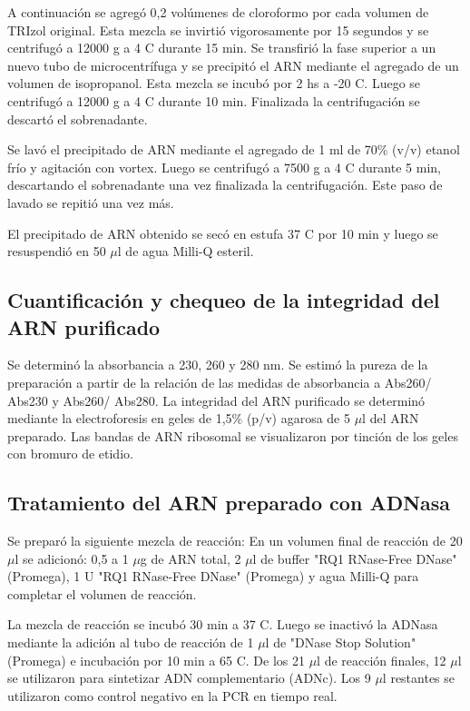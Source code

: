 A continuación se agregó 0,2 volúmenes de cloroformo por cada volumen de TRIzol original.
Esta mezcla se invirtió vigorosamente por 15 segundos y se centrifugó a 12000 g a 4 \degree C durante 15 min.
Se transfirió la fase superior a un nuevo tubo de microcentrífuga y se precipitó el ARN mediante el agregado de un volumen de isopropanol.
Esta mezcla se incubó por 2 hs a -20 \degree C. Luego se centrifugó a 12000 g a 4 \degree C durante 10 min.
Finalizada la centrifugación se descartó el sobrenadante.

Se lavó el precipitado de ARN mediante el agregado de 1 ml de 70\% (v/v) etanol frío y agitación con vortex.
Luego se centrifugó a 7500 g a 4 \degree C durante 5 min, descartando el sobrenadante una vez finalizada la centrifugación. 
Este paso de lavado se repitió una vez más.

El precipitado de ARN obtenido se secó en estufa 37 \degree C por 10 min y luego se resuspendió en 50 $\mu$l de agua Milli-Q esteril.

\subsection{Cuantificación y chequeo de la integridad del ARN purificado}
Se determinó la absorbancia a 230, 260 y 280 nm. Se estimó la pureza de la preparación a partir de la relación de las medidas de absorbancia a Abs260/ Abs230 y Abs260/ Abs280.
La integridad del ARN purificado se determinó mediante la electroforesis en geles de 1,5\% (p/v) agarosa de 5 $\mu$l del ARN preparado. Las bandas de
ARN ribosomal se visualizaron por tinción de los geles con bromuro de etidio.

\subsection{Tratamiento del ARN preparado con ADNasa}
Se preparó la siguiente mezcla de reacción:
En un volumen final de reacción de 20 $\mu$l se adicionó: 0,5 a 1 $\mu$g de ARN total, 2 $\mu$l de buffer "RQ1 RNase-Free DNase" (Promega), 1 U "RQ1 RNase-Free DNase" (Promega) y agua Milli-Q para completar el volumen de reacción.

La mezcla de reacción se incubó 30 min a 37 \degree C. Luego se inactivó la ADNasa mediante la adición al tubo de reacción de 1 $\mu$l de "DNase Stop Solution" (Promega) e incubación por 10 min a 65 \degree  C.
De los 21 $\mu$l de reacción finales, 12 $\mu$l se utilizaron para sintetizar ADN complementario (ADNc).
Los 9 $\mu$l restantes se utilizaron como control negativo en la PCR en tiempo real.

